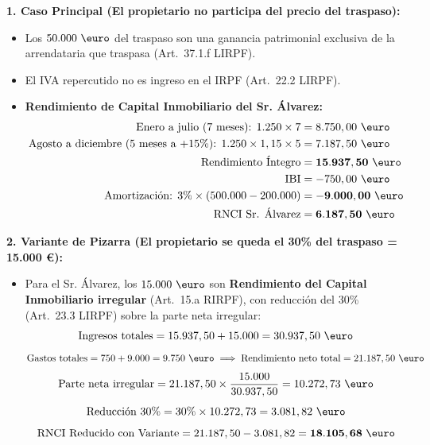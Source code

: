 \documentclass[11pt,a4paper,openany]{article}
\begin{document}
\begin{solucionBox}
\textbf{1. Caso Principal (El propietario no participa del precio del traspaso):}
\begin{itemize}
    \item Los $50.000\text{ \euro}$ del traspaso son una ganancia patrimonial exclusiva de la arrendataria que traspasa (Art.~37.1.f LIRPF).
    \item El IVA repercutido no es ingreso en el IRPF (Art.~22.2 LIRPF).
    \item \textbf{Rendimiento de Capital Inmobiliario del Sr. Álvarez:}
    \begin{align*}
        \text{Enero a julio (7 meses): } 1.250 \times 7 &= 8.750,00\text{ \euro} \\
        \text{Agosto a diciembre (5 meses a +15\%): } 1.250 \times 1,15 \times 5 &= 7.187,50\text{ \euro} \\
        \mathbf{\text{Rendimiento Íntegro}} &= \mathbf{15.937,50\text{ \euro}} \\
        \text{IBI} &= -750,00\text{ \euro} \\
        \text{Amortización: } 3\% \times (500.000 - 200.000) &= -\mathbf{9.000,00\text{ \euro}} \\
        \mathbf{\text{RNCI Sr. Álvarez}} &= \mathbf{6.187,50\text{ \euro}}
    \end{align*}
\end{itemize}

\textbf{2. Variante de Pizarra (El propietario se queda el 30\% del traspaso = 15.000 \euro):}
\begin{itemize}
    \item Para el Sr. Álvarez, los $15.000\text{ \euro}$ son \textbf{Rendimiento del Capital Inmobiliario irregular} (Art.~15.a RIRPF), con reducción del 30\% (Art.~23.3 LIRPF) sobre la parte neta irregular:
    $$\text{Ingresos totales} = 15.937,50 + 15.000 = 30.937,50\text{ \euro}$$
    $$\text{Gastos totales} = 750 + 9.000 = 9.750\text{ \euro} \implies \text{Rendimiento neto total} = 21.187,50\text{ \euro}$$
    $$\text{Parte neta irregular} = 21.187,50 \times \frac{15.000}{30.937,50} = 10.272,73\text{ \euro}$$
    $$\text{Reducción 30\%} = 30\% \times 10.272,73 = 3.081,82\text{ \euro}$$
    $$\mathbf{\text{RNCI Reducido con Variante}} = 21.187,50 - 3.081,82 = \mathbf{18.105,68\text{ \euro}}$$
\end{itemize}
\end{solucionBox}
\end{document}
